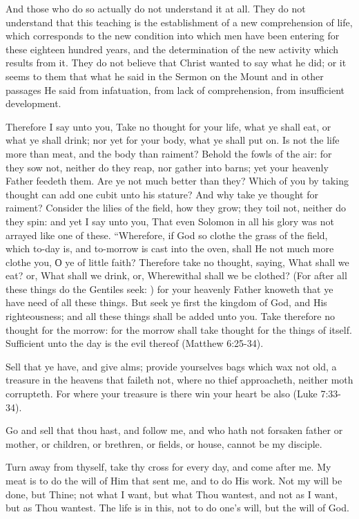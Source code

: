 \documentclass{book}
\begin{document}
And those who do so actually do not understand it at all. They do not understand that this teaching is the establishment of a new comprehension of life, which corresponds to the new condition into which men have been entering for these eighteen hundred years, and the determination of the new activity which results from it. They do not believe that Christ wanted to say what he did; or it seems to them that what he said in the Sermon on the Mount and in other passages He said from infatuation, from lack of comprehension, from insufficient development.\footnotemark[2]

Therefore I say unto you, Take no thought for your life, what ye shall eat, or what ye shall drink; nor yet for your body, what ye shall put on. Is not the life more than meat, and the body than raiment? Behold the fowls of the air: for they sow not, neither do they reap, nor gather into barns; yet your heavenly Father feedeth them. Are ye not much better than they? Which of you by taking thought can add one cubit unto his stature? And why take ye thought for raiment? Consider the lilies of the field, how they grow; they toil not, neither do they spin: and yet I say unto you, That even Solomon in all his glory was not arrayed like one of these. “Wherefore, if God so clothe the grass of the field, which to-day is, and to-morrow is cast into the oven, shall He not much more clothe you, О ye of little faith? Therefore take no thought, saying, What shall we eat? or, What shall we drink, or, Wherewithal shall we be clothed? (For after all these things do the Gentiles seek: ) for your heavenly Father knoweth that ye have need of all these things. But seek ye first the kingdom of God, and His righteousness; and all these things shall be added unto you. Take therefore no thought for the morrow: for the morrow shall take thought for the things of itself. Sufficient unto the day is the evil thereof (Matthew 6:25-34).

Sell that ye have, and give alms; provide yourselves bags which wax not old, a treasure in the heavens that faileth not, where no thief approacheth, neither moth corrupteth. For where your treasure is there win your heart be also (Luke 7:33-34).

Go and sell that thou hast, and follow me, and who hath not forsaken father or mother, or children, or brethren, or fields, or house, cannot be my disciple.

Turn away from thyself, take thy cross for every day, and come after me. My meat is to do the will of Him that sent me, and to do His work. Not my will be done, but Thine; not what I want, but what Thou wantest, and not as I want, but as Thou wantest. The life is in this, not to do one’s will, but the will of God.
\end{document}

